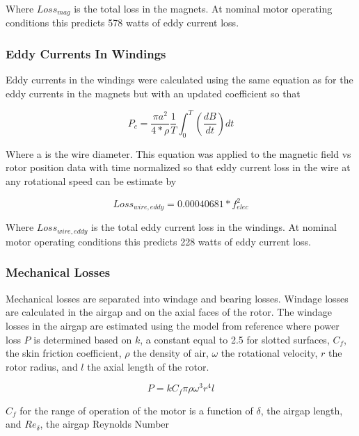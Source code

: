 \documentclass[]{aiaa-tc}%
\begin{document}
Where $Loss_{mag}$ is the total loss in the magnets. At nominal motor operating conditions this predicts 578 watts of eddy current loss.

\subsubsection{Eddy Currents In Windings}
Eddy currents in the windings were calculated using the same equation as for the eddy currents in the magnets but with an updated coefficient so that

\begin{equation}
P_{c} = \frac{\pi a^2}{4*\rho}\frac{1}{T}\int_{0}^{T}(\frac{dB}{dt})dt
\label{eq:EddyLoss3}
\end{equation}

Where a is the wire diameter. This equation was applied to the magnetic field vs rotor position data with time normalized so that eddy current loss in the wire at any rotational speed can be estimate by

\begin{equation}
Loss_{wire,eddy} = 0.00040681*f_{elec}^{2}
\label{eq:EddyLoss4}
\end{equation}

Where $Loss_{wire,eddy}$ is the total eddy current loss in the windings. At nominal motor operating conditions this predicts 228 watts of eddy current loss.

\subsubsection{Mechanical Losses}

Mechanical losses are separated into windage and bearing losses. Windage losses are calculated in the airgap and on the axial faces of the rotor. 
The windage losses in the airgap are estimated using the model from reference \cite{Huang} where power loss $P$ is determined based on $k$, a constant equal to 2.5 for slotted surfaces, $C_{f}$, the skin friction coefficient, $\rho$ the density of air, $\omega$ the rotational velocity, $r$ the rotor radius, and $l$ the axial length of the rotor.

\begin{equation}
P = kC_{f}\pi\rho\omega^{3}r^{4}l
\label{eq:Windage}
\end{equation}

$C_{f}$ for the range of operation of the motor is a function of $\delta$, the airgap length, and $Re_{\delta}$, the airgap Reynolds Number
\end{document}
